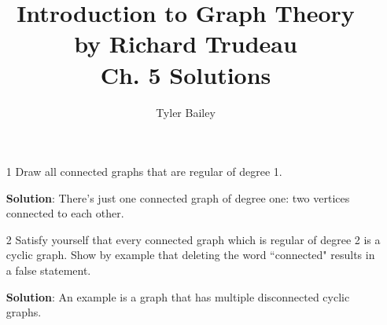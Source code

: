 \documentclass{article}
\begin{document}
	\title{%
  	Introduction to Graph Theory \\
  		\large by Richard Trudeau \\
   		Ch. 5 Solutions}
   		\author{Tyler Bailey}
	\maketitle

	\begin{enumerate}

		\item[1] Draw all connected graphs that are regular of degree 1.
		
		\textbf{Solution}: There's just one connected graph of degree one: two vertices connected to each other.
		
		\item[2] Satisfy yourself that every connected graph which is regular of degree 2 is a cyclic graph. Show by example that deleting the word ``connected" results in a false statement.
		
		\textbf{Solution}: An example is a graph that has multiple disconnected cyclic graphs.
			
	\end{enumerate}
\end{document}
